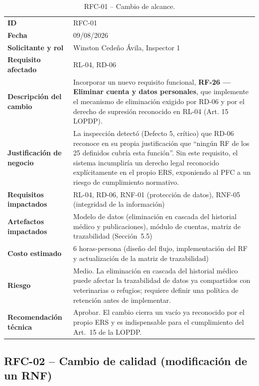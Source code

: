 \documentclass[journal,onecolumn]{IEEEtran}
\begin{document}
\begin{table}[H]
	\centering
	\small
	\begin{tabularx}{\textwidth}{@{}l X@{}}
		\toprule
		\textbf{ID} & RFC-01 \\
		\textbf{Fecha} & 09/08/2026 \\
		\textbf{Solicitante y rol} & Winston Cedeño Ávila, Inspector 1 \\
		\textbf{Requisito afectado} & RL-04, RD-06 \\
		\midrule
		\textbf{Descripción del cambio} & Incorporar un nuevo requisito funcional, \textbf{RF-26 --- Eliminar cuenta y datos personales}, que implemente el mecanismo de eliminación exigido por RD-06 y por el derecho de supresión reconocido en RL-04 (Art. 15 LOPDP). \\
		\textbf{Justificación de negocio} & La inspección detectó (Defecto 5, crítico) que RD-06 reconoce en su propia justificación que ``ningún RF de los 25 definidos cubría esta función''. Sin este requisito, el sistema incumpliría un derecho legal reconocido explícitamente en el propio ERS, exponiendo al PFC a un riesgo de cumplimiento normativo. \\
		\textbf{Requisitos impactados} & RL-04, RD-06, RNF-01 (protección de datos), RNF-05 (integridad de la información) \\
		\textbf{Artefactos impactados} & Modelo de datos (eliminación en cascada del historial médico y publicaciones), módulo de cuentas, matriz de trazabilidad (Sección~5.5) \\
		\textbf{Costo estimado} & 6 horas-persona (diseño del flujo, implementación del RF y actualización de la matriz de trazabilidad) \\
		\textbf{Riesgo} & Medio. La eliminación en cascada del historial médico puede afectar la trazabilidad de datos ya compartidos con veterinarias o refugios; requiere definir una política de retención antes de implementar. \\
		\textbf{Recomendación técnica} & Aprobar. El cambio cierra un vacío ya reconocido por el propio ERS y es indispensable para el cumplimiento del Art.~15 de la LOPDP. \\
		\bottomrule
	\end{tabularx}
	\caption{RFC-01 -- Cambio de alcance.}
	\label{tab:rfc-01}
\end{table}

\subsection{RFC-02 -- Cambio de calidad (modificación de un RNF)}
\end{document}
